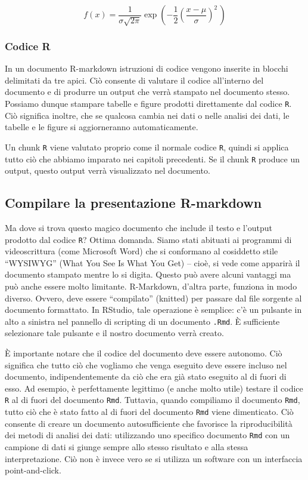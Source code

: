 \documentclass[
  11pt,
]{krantz}
\theoremstyle{definition}
\theoremstyle{definition}
\theoremstyle{definition}
\theoremstyle{definition}
\theoremstyle{remark}
\begin{document}
\[
f(x) = \frac{1}{\sigma\sqrt{2\pi}}
  \exp\left( -\frac{1}{2}\left(\frac{x-\mu}{\sigma}\right)^{\!2}\,\right)
\]

\hypertarget{codice-r}{%
\subsubsection{Codice R}\label{codice-r}}

In un documento R-markdown istruzioni di codice vengono inserite in blocchi delimitati da tre apici. Ciò consente di valutare il codice all'interno del documento e di produrre un output che verrà stampato nel documento stesso. Possiamo dunque stampare tabelle e figure prodotti direttamente dal codice \texttt{R}. Ciò significa inoltre, che se qualcosa cambia nei dati o nelle analisi dei dati, le tabelle e le figure si aggiorneranno automaticamente.

Un chunk \texttt{R} viene valutato proprio come il normale codice \texttt{R}, quindi si applica tutto ciò che abbiamo imparato nei capitoli precedenti. Se il chunk \texttt{R} produce un output, questo output verrà visualizzato nel documento.

\hypertarget{compilare-la-presentazione-r-markdown}{%
\subsection{Compilare la presentazione R-markdown}\label{compilare-la-presentazione-r-markdown}}

Ma dove si trova questo magico documento che include il testo e l'output prodotto dal codice \texttt{R}? Ottima domanda. Siamo stati abituati ai programmi di videoscrittura (come Microsoft Word) che si conformano al cosiddetto stile ``WYSIWYG'' (What You See Is What You Get) -- cioè, si vede come apparirà il documento stampato mentre lo si digita. Questo può avere alcuni vantaggi ma può anche essere molto limitante. R-Markdown, d'altra parte, funziona in modo diverso. Ovvero, deve essere ``compilato'' (knitted) per passare dal file sorgente al documento formattato. In RStudio, tale operazione è semplice: c'è un pulsante in alto a sinistra nel pannello di scripting di un documento \texttt{.Rmd}. È sufficiente selezionare tale pulsante e il nostro documento verrà creato.

È importante notare che il codice del documento deve essere autonomo. Ciò significa che tutto ciò che vogliamo che venga eseguito deve essere incluso nel documento, indipendentemente da ciò che era già stato eseguito al di fuori di esso. Ad esempio, è perfettamente legittimo (e anche molto utile) testare il codice \texttt{R} al di fuori del documento \texttt{Rmd}. Tuttavia, quando compiliamo il documento \texttt{Rmd}, tutto ciò che è stato fatto al di fuori del documento \texttt{Rmd} viene dimenticato. Ciò consente di creare un documento autosufficiente che favorisce la riproducibilità dei metodi di analisi dei dati: utilizzando uno specifico documento \texttt{Rmd} con un campione di dati si giunge sempre allo stesso risultato e alla stessa interpretazione. Ciò non è invece vero se si utilizza un software con un interfaccia point-and-click.
\end{document}
